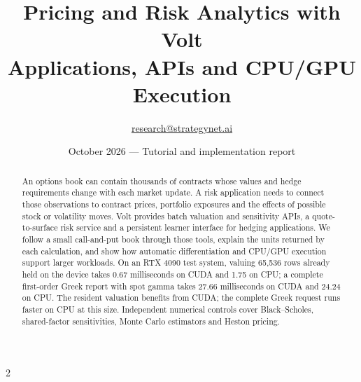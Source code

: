 \documentclass[8pt]{strategynet-journal}
\title{Pricing and Risk Analytics with Volt\\\large Applications, APIs and CPU/GPU Execution}
\author{\href{mailto:research@strategynet.ai}{research@strategynet.ai}}
\date{October 2026 --- Tutorial and implementation report}
\begin{document}
\maketitle
\begin{abstract}
\normalsize An options book can contain thousands of contracts whose values and hedge requirements change with each market update. A risk application needs to connect those observations to contract prices, portfolio exposures and the effects of possible stock or volatility moves. Volt provides batch valuation and sensitivity APIs, a quote-to-surface risk service and a persistent learner interface for hedging applications. We follow a small call-and-put book through those tools, explain the units returned by each calculation, and show how automatic differentiation and CPU/GPU execution support larger workloads. On an RTX 4090 test system, valuing 65,536 rows already held on the device takes 0.67 milliseconds on CUDA and 1.75 on CPU; a complete first-order Greek report with spot gamma takes 27.66 milliseconds on CUDA and 24.24 on CPU. The resident valuation benefits from CUDA; the complete Greek request runs faster on CPU at this size. Independent numerical controls cover Black--Scholes, shared-factor sensitivities, Monte Carlo estimators and Heston pricing.
\end{abstract}
\begin{multicols}{2}
\tableofcontents
\end{multicols}
\thispagestyle{fancy}
\clearpage
\end{document}
